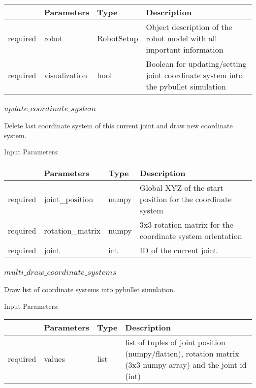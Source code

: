 \documentclass[
	ngerman,
	accentcolor=9c,%
	type=intern,
	marginpar=false
	]{tudapub}
\begin{document}
\begin{tabular}{|p{}|p{}|p{}| p{}|}
\hline
 & \textbf{Parameters} & \textbf{Type} & \textbf{Description} \\
\hline
required & robot & RobotSetup & Object description of the robot model with all important information \\
\hline
required & visualization & bool & Boolean for updating/setting joint coordinate system into the pybullet simulation \\
\hline
\end{tabular}
\vspace{1cm}

\subsubsection{$update\_coordinate\_system$}
\noindent Delete last coordinate system of this current joint and draw new coordinate system.

\vspace{0.5cm}
\noindent Input Parameters:
\vspace{0.5cm}

\begin{tabular}{|p{}|p{}|p{}| p{}|}
\hline
 & \textbf{Parameters} & \textbf{Type} & \textbf{Description} \\
\hline
required & joint\_position & numpy & Global XYZ of the start position for the coordinate system \\
\hline
required & rotation\_matrix & numpy & 3x3 rotation matrix for the coordinate system orientation \\
\hline
required & joint & int & ID of the current joint \\
\hline
\end{tabular}
\vspace{1cm}


\subsubsection{$multi\_draw\_coordinate\_systems$}
\noindent Draw list of coordinate systems into pybullet simulation.

\vspace{0.5cm}
\noindent Input Parameters:
\vspace{0.5cm}

\begin{tabular}{|p{}|p{}|p{}| p{}|}
\hline
 & \textbf{Parameters} & \textbf{Type} & \textbf{Description} \\
\hline
required & values & list & list of tuples of joint position (numpy/flatten), rotation matrix (3x3 numpy array) and the joint id (int) \\
\hline
\end{tabular}
\vspace{1cm}
\end{document}
